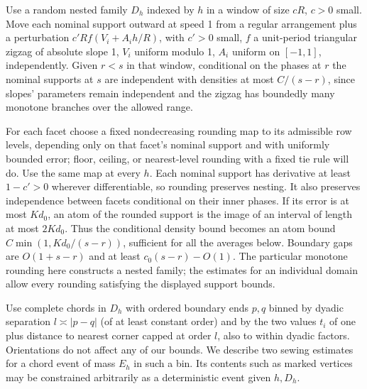 Use a random nested family \(D_h\) indexed by \(h\) in a window of size \(cR\), \(c>0\) small. Move each nominal support outward at speed 1 from a regular arrangement plus a perturbation \(c' R f(V_i+A_i h/R)\), with \(c'>0\) small, \(f\) a unit-period triangular zigzag of absolute slope 1, \(V_i\) uniform modulo 1, \(A_i\) uniform on \([-1,1]\), independently. Given \(r<s\) in that window, conditional on the phases at \(r\) the nominal supports at \(s\) are independent with densities at most \(C/(s-r)\), since slopes' parameters remain independent and the zigzag has boundedly many monotone branches over the allowed range.

For each facet choose a fixed nondecreasing rounding map to its admissible row levels, depending only on that facet's nominal support and with uniformly bounded error; floor, ceiling, or nearest-level rounding with a fixed tie rule will do. Use the same map at every \(h\). Each nominal support has derivative at least \(1-c'>0\) wherever differentiable, so rounding preserves nesting. It also preserves independence between facets conditional on their inner phases. If its error is at most \(K d_0\), an atom of the rounded support is the image of an interval of length at most \(2K d_0\). Thus the conditional density bound becomes an atom bound \(C\min(1,Kd_0/(s-r))\), sufficient for all the averages below. Boundary gaps are \(O(1+s-r)\) and at least \(c_0(s-r)-O(1)\). The particular monotone rounding here constructs a nested family; the estimates for an individual domain allow every rounding satisfying the displayed support bounds.

Use complete chords in \(D_h\) with ordered boundary ends \(p,q\) binned by dyadic separation \(l\asymp |p-q|\) (of at least constant order) and by the two values \(t_i\) of one plus distance to nearest corner capped at order \(l\), also to within dyadic factors. Orientations do not affect any of our bounds. We describe two sewing estimates for a chord event of mass \(E_h\) in such a bin. Its contents such as marked vertices may be constrained arbitrarily as a deterministic event given \(h,D_h\).

